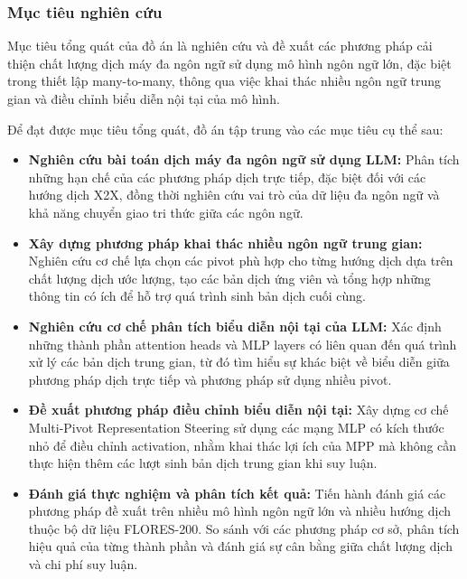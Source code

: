 \subsubsection{Mục tiêu nghiên cứu}

Mục tiêu tổng quát của đồ án là nghiên cứu và đề xuất các phương pháp cải thiện chất lượng dịch máy đa ngôn ngữ sử dụng mô hình ngôn ngữ lớn, đặc biệt trong thiết lập many-to-many, thông qua việc khai thác nhiều ngôn ngữ trung gian và điều chỉnh biểu diễn nội tại của mô hình.

Để đạt được mục tiêu tổng quát, đồ án tập trung vào các mục tiêu cụ thể sau:

\begin{itemize}
    \item \textbf{Nghiên cứu bài toán dịch máy đa ngôn ngữ sử dụng LLM:}
    Phân tích những hạn chế của các phương pháp dịch trực tiếp, đặc biệt đối với các hướng dịch X2X, đồng thời nghiên cứu vai trò của dữ liệu đa ngôn ngữ và khả năng chuyển giao tri thức giữa các ngôn ngữ.

    \item \textbf{Xây dựng phương pháp khai thác nhiều ngôn ngữ trung gian:}
    Nghiên cứu cơ chế lựa chọn các pivot phù hợp cho từng hướng dịch dựa trên chất lượng dịch ước lượng, tạo các bản dịch ứng viên và tổng hợp những thông tin có ích để hỗ trợ quá trình sinh bản dịch cuối cùng.

    \item \textbf{Nghiên cứu cơ chế phân tích biểu diễn nội tại của LLM:}
    Xác định những thành phần attention heads và MLP layers có liên quan đến quá trình xử lý các bản dịch trung gian, từ đó tìm hiểu sự khác biệt về biểu diễn giữa phương pháp dịch trực tiếp và phương pháp sử dụng nhiều pivot.

    \item \textbf{Đề xuất phương pháp điều chỉnh biểu diễn nội tại:}
    Xây dựng cơ chế Multi-Pivot Representation Steering sử dụng các mạng MLP có kích thước nhỏ để điều chỉnh activation, nhằm khai thác lợi ích của MPP mà không cần thực hiện thêm các lượt sinh bản dịch trung gian khi suy luận.

    \item \textbf{Đánh giá thực nghiệm và phân tích kết quả:}
    Tiến hành đánh giá các phương pháp đề xuất trên nhiều mô hình ngôn ngữ lớn và nhiều hướng dịch thuộc bộ dữ liệu FLORES-200. So sánh với các phương pháp cơ sở, phân tích hiệu quả của từng thành phần và đánh giá sự cân bằng giữa chất lượng dịch và chi phí suy luận.
\end{itemize}

